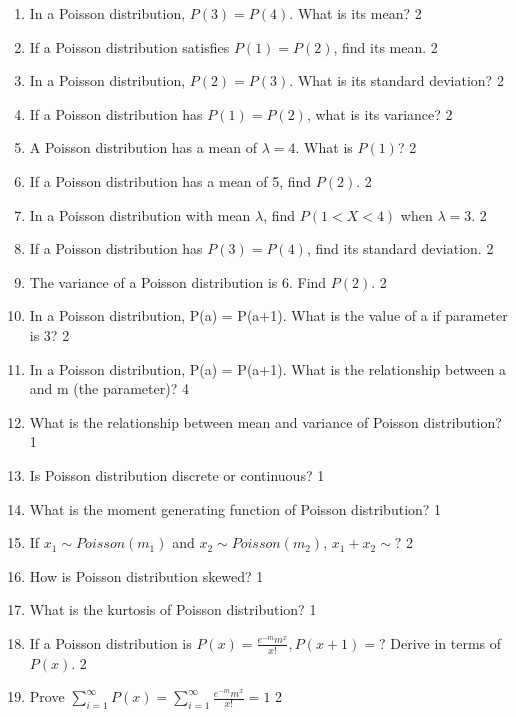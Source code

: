 \documentclass[a4paper,oneside, margin=1.4in]{book}
\begin{document}
\begin{enumerate}
\item In a Poisson distribution, \( P(3) = P(4) \). What is its mean? \hfill 2

\item If a Poisson distribution satisfies \( P(1) = P(2) \), find its mean. \hfill 2

\item In a Poisson distribution, \( P(2) = P(3) \). What is its standard deviation? \hfill 2

\item If a Poisson distribution has \( P(1) = P(2) \), what is its variance? \hfill 2

\item A Poisson distribution has a mean of \( \lambda = 4 \). What is \( P(1) \)? \hfill 2

\item If a Poisson distribution has a mean of 5, find \( P(2) \). \hfill 2

\item In a Poisson distribution with mean \( \lambda \), find \( P(1 < X < 4) \) when \( \lambda = 3 \). \hfill 2

\item If a Poisson distribution has \( P(3) = P(4) \), find its standard deviation. \hfill 2

\item The variance of a Poisson distribution is 6. Find \( P(2) \). \hfill 2

 \item In a Poisson distribution, P(a) = P(a+1). What is the value of a if parameter is 3? \hfill 2

\item In a Poisson distribution, P(a) = P(a+1). What is the relationship between a and m (the parameter)? \hfill 4

\item What is the relationship between mean and variance of Poisson distribution? \hfill 1

\item Is Poisson distribution discrete or continuous? \hfill 1

\item What is the moment generating function of Poisson distribution? \hfill 1

\item If $x_1 \sim Poisson (m_1)$ and  $x_2 \sim Poisson (m_2)$,  $x_1 + x_2 \sim ?$ \hfill 2

\item How is Poisson distribution skewed? \hfill 1

\item What is the kurtosis of Poisson distribution? \hfill 1

\item If a Poisson distribution is $P(x) = \frac{e^{-m}m^x}{x!}, P(x+1) = ?$ Derive in terms of $P(x)$. \hfill 2

\item Prove $\displaystyle \sum_{i=1}^{\infty} P(x) = \sum_{i=1}^{\infty} \frac{e^{-m} m^x}{x!} = 1$ \hfill 2
\end{enumerate}
\end{document}
